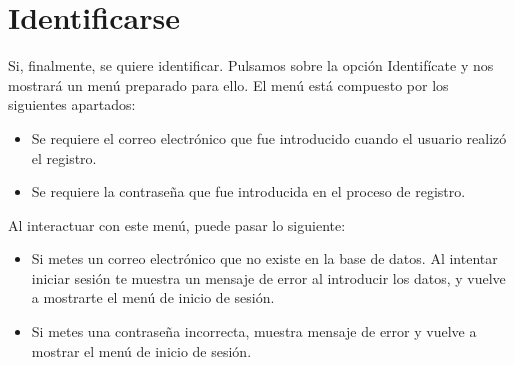 \documentclass[letterpaper,10pt,spanish]{sphinxmanual}
\begin{document}
\section{Identificarse}
\label{\detokenize{documentos/ejecucion:identificarse}}
\sphinxAtStartPar
Si, finalmente, se quiere identificar. Pulsamos sobre la opción Identifícate y nos mostrará un menú preparado para ello. El menú está compuesto por los siguientes apartados:
\begin{itemize}
\item {} 
\sphinxAtStartPar
{} Se requiere el correo electrónico que fue introducido cuando el usuario realizó el registro.

\item {} 
\sphinxAtStartPar
{} Se requiere la contraseña que fue introducida en el proceso de registro.

\end{itemize}

\sphinxAtStartPar
Al interactuar con este menú, puede pasar lo siguiente:
\begin{itemize}
\item {} 
\sphinxAtStartPar
Si metes un correo electrónico que no existe en la base de datos. Al intentar iniciar sesión te muestra un mensaje de error al introducir los datos, y vuelve a mostrarte el menú de inicio de sesión.

\item {} 
\sphinxAtStartPar
Si metes una contraseña incorrecta, muestra mensaje de error y vuelve a mostrar el menú de inicio de sesión.

\end{itemize}
\end{document}
